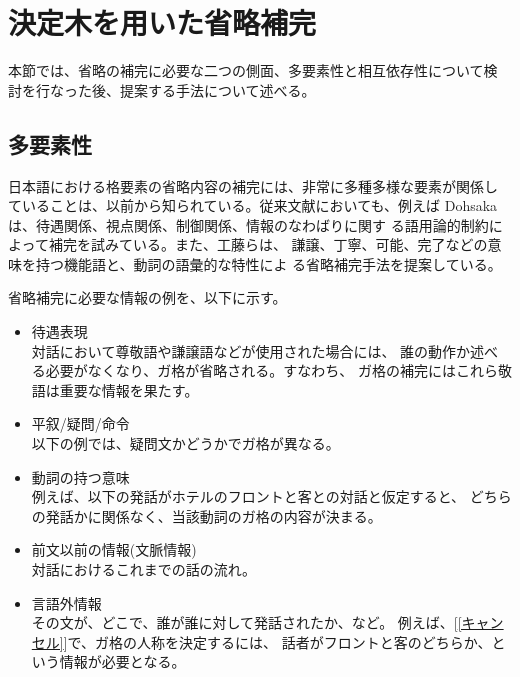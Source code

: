 \section{決定木を用いた省略補完}
\label{節:手法}

本節では、省略の補完に必要な二つの側面、多要素性と相互依存性について検
討を行なった後、提案する手法について述べる。


\subsection{多要素性}

日本語における格要素の省略内容の補完には、非常に多種多様な要素が関係し
ていることは、以前から知られている。従来文献においても、例えば Dohsaka
{}\cite{Dohsaka}は、待遇関係、視点関係、制御関係、情報のなわばりに関す
る語用論的制約によって補完を試みている。また、工藤ら{}\cite{工藤}は、
謙譲、丁寧、可能、完了などの意味を持つ機能語と、動詞の語彙的な特性によ
る省略補完手法を提案している。

省略補完に必要な情報の例を、以下に示す。

\begin{itemize}
        \item 待遇表現\\
                対話において尊敬語や謙譲語などが使用された場合には、
                誰の動作か述べる必要がなくなり、ガ格が省略される。すなわち、
                ガ格の補完にはこれら敬語は重要な情報を果たす。
        \item 平叙/疑問/命令\\
                以下の例では、疑問文かどうかでガ格が異なる。
        \item 動詞の持つ意味\\
                例えば、以下の発話がホテルのフロントと客との対話と仮定すると、
                どちらの発話かに関係なく、当該動詞のガ格の内容が決まる。
        \item 前文以前の情報(文脈情報)\\
        対話におけるこれまでの話の流れ。
        \item 言語外情報\\
        その文が、どこで、誰が誰に対して発話されたか、など。
        例えば、[\ref{キャンセル}]で、ガ格の人称を決定するには、
        話者がフロントと客のどちらか、という情報が必要となる。
\end{itemize}


